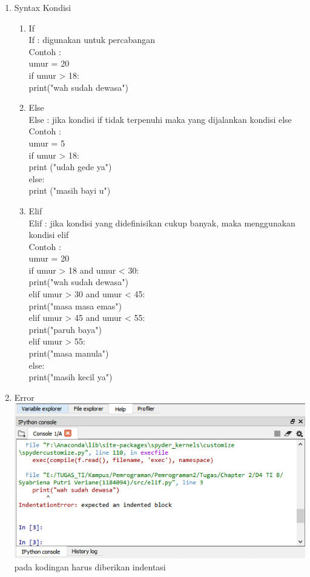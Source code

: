 \begin{enumerate}
\item Syntax Kondisi\\
\begin{enumerate}[label=\alph*.]
\item If\\
If : digunakan untuk percabangan\\
Contoh :\\
umur = 20\\
if umur > 18:\\
    print("wah sudah dewasa")\\
\item Else\\
Else : jika kondisi if tidak terpenuhi maka yang dijalankan kondisi else\\
Contoh :\\
umur = 5\\
if umur > 18:\\
    print ("udah gede ya")\\
else:\\
    print ("masih bayi u")\\
\item Elif\\
Elif : jika kondisi yang didefinisikan cukup banyak, maka menggunakan kondisi elif\\
Contoh :\\
umur = 20\\
if umur > 18 and umur < 30:\\
    print("wah sudah dewasa")\\
elif umur > 30 and umur < 45:\\
    print("masa masa emas")\\
elif umur > 45 and umur < 55:\\
    print("paruh baya")\\
elif umur > 55:\\
    print("masa manula")\\
else:\\
    print("masih kecil ya")\\
\end{enumerate}

\item Error\\
\includegraphics{gambar/error.png}
pada kodingan harus diberikan indentasi 


\end{enumerate}
